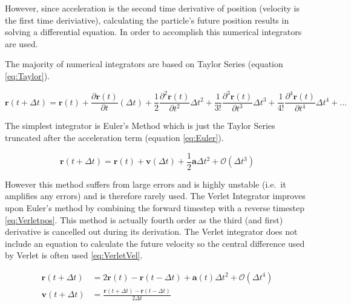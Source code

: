 \documentclass[12pt]{UoAthesis}
\begin{document}
However, since acceleration is the second time derivative of position
(velocity is the first time deriviative), calculating the particle's
future position results in solving a differential equation. In order
to accomplish this numerical integrators are used.

The majority of numerical integrators are based on Taylor Series
(equation \ref{eq:Taylor}).

\begin{equation} 
\mathbf{r}(t+\Delta t) = \mathbf{r}(t) + 
\frac{\partial\mathbf{r}(t)}{\partial t}(\Delta t) + 
\frac{1}{2}\frac{\partial^2\mathbf{r}(t)}{\partial t^2}\Delta t^2 + 
\frac{1}{3!}\frac{\partial^3\mathbf{r}(t)}{\partial t^3}\Delta t^3 
+ \frac{1}{4!}\frac{\partial^4\mathbf{r}(t)}{\partial t^4}\Delta t^4 
+ ... \label{eq:Taylor} 
\end{equation}

The simplest integrator is Euler's Method which is just the Taylor
Series truncated after the acceleration term (equation
\ref{eq:Euler}).

\begin{equation} 
  \mathbf{r}(t+\Delta t) = \mathbf{r}(t) + \mathbf{v}(\Delta t) +
  \frac{1}{2}\mathbf{a}\Delta t^2 + \mathcal{O}(\Delta t^3) 
  \label{eq:Euler}
\end{equation}

However this method suffers from large errors and is highly unstable
(i.e.\ it amplifies any errors) \cite{Haile1997} and is therefore rarely
used. The Verlet Integrator \cite{Verlet1967} improves upon Euler's
method by combining the forward timestep with a reverse timestep
\eqref{eq:Verletpos}. This method is actually fourth order as the
third (and first) derivative is cancelled out during its
derivation. The Verlet integrator does not include an equation to
calculate the future velocity so the central difference used by Verlet
is often used \eqref{eq:VerletVel}.

\begin{subequations} 
  \begin{align} 
    \mathbf{r}(t + \Delta t) &= 2\mathbf{r}(t) - \mathbf{r}(t - \Delta t) 
    + \mathbf{a}(t)\Delta t^2 + \mathcal{O}(\Delta t^4)
    \label{eq:Verletpos} \\
    \mathbf{v}(t+\Delta t) &= \frac{\mathbf{r}(t+\Delta t) -
      \mathbf{r}(t-\Delta t)}{2\Delta t} 
    \label{eq:VerletVel} 
  \end{align}
\end{subequations}
\end{document}
